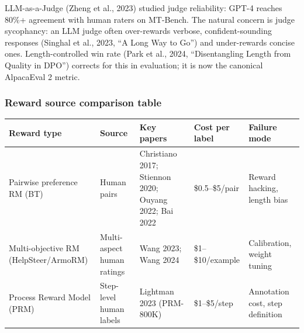 LLM-as-a-Judge (Zheng et al., 2023) studied judge reliability: GPT-4 reaches 80\%+ agreement with human raters on MT-Bench. The natural concern is judge sycophancy: an LLM judge often over-rewards verbose, confident-sounding responses (Singhal et al., 2023, ``A Long Way to Go'') and under-rewards concise ones. Length-controlled win rate (Park et al., 2024, ``Disentangling Length from Quality in DPO'') corrects for this in evaluation; it is now the canonical AlpacaEval 2 metric.

\subsubsection{Reward source comparison table}\label{reward-source-comparison-table}

{\def\LTcaptype{none} %
\begin{longtable}[]{@{}
  >{\raggedright\arraybackslash}p{}
  >{\raggedright\arraybackslash}p{}
  >{\raggedright\arraybackslash}p{}
  >{\raggedright\arraybackslash}p{}
  >{\raggedright\arraybackslash}p{}@{}}
\toprule\noalign{}
\begin{minipage}[b]{\linewidth}\raggedright
Reward type
\end{minipage} & \begin{minipage}[b]{\linewidth}\raggedright
Source
\end{minipage} & \begin{minipage}[b]{\linewidth}\raggedright
Key papers
\end{minipage} & \begin{minipage}[b]{\linewidth}\raggedright
Cost per label
\end{minipage} & \begin{minipage}[b]{\linewidth}\raggedright
Failure mode
\end{minipage} \\
\midrule\noalign{}
\endhead
\bottomrule\noalign{}
\endlastfoot
Pairwise preference RM (BT) & Human pairs & Christiano 2017; Stiennon 2020; Ouyang 2022; Bai 2022 & \$0.5--\$5/pair & Reward hacking, length bias \\
Multi-objective RM (HelpSteer/ArmoRM) & Multi-aspect human ratings & Wang 2023; Wang 2024 & \$1--\$10/example & Calibration, weight tuning \\
Process Reward Model (PRM) & Step-level human labels & Lightman 2023 (PRM-800K) & \$1--\$5/step & Annotation cost, step definition \\

\end{longtable}}
